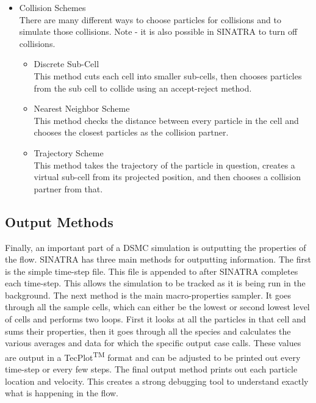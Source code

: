 \begin{itemize}
    
    \item Collision Schemes \\
    There are many different ways to choose particles for collisions and to simulate those collisions. Note - it is also possible in SINATRA to turn off collisions.
    \begin{itemize}
        \item Discrete Sub-Cell\\
        This method cuts each cell into smaller sub-cells, then chooses particles from the sub cell to collide using an accept-reject method. 
        \item Nearest Neighbor Scheme\\
        This method checks the distance between every particle in the cell and chooses the closest particles as the collision partner.
        \item Trajectory Scheme\\
        This method takes the trajectory of the particle in question, creates a virtual sub-cell from its projected position, and then chooses a collision partner from that. 
    \end{itemize}
\end{itemize}


\subsection{Output Methods}
\label{sec:output}

Finally, an important part of a DSMC simulation is outputting the properties of the flow. SINATRA has three main methods for outputting information. The first is the simple time-step file. This file is appended to after SINATRA completes each time-step. This allows the simulation to be tracked as it is being run in the background. The next method is the main macro-properties sampler. It goes through all the sample cells, which can either be the lowest or second lowest level of cells and performs two loops. First it looks at all the particles in that cell and sums their properties, then it goes through all the species and calculates the various averages and data for which the specific output case calls. These values are output in a TecPlot\textsuperscript{TM} format and can be adjusted to be printed out every time-step or every few steps. The final output method prints out each particle location and velocity. This creates a strong debugging tool to understand exactly what is happening in the flow. 